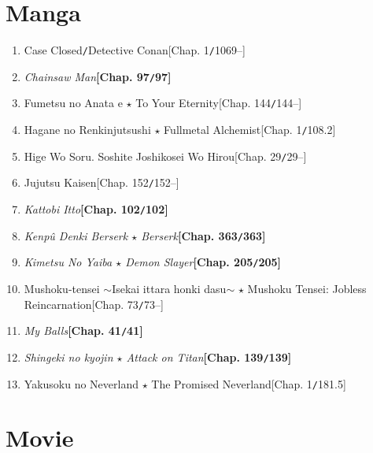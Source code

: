 \documentclass{article}
\numberwithin{equation}{section}
\begin{document}
\section{Manga}
\begin{enumerate}
    \item Case Closed\texttt{/}Detective Conan\hfill[Chap. 1\texttt{/}1069--]
    \item \textit{Chainsaw Man}\hfill\textbf{[Chap. 97\texttt{/}97]}
    \item Fumetsu no Anata e $\star$ To Your Eternity\hfill[Chap. 144\texttt{/}144--]
    \item Hagane no Renkinjutsushi $\star$ Fullmetal Alchemist\hfill[Chap. 1\texttt{/}108.2]
    \item Hige Wo Soru. Soshite Joshikosei Wo Hirou\hfill[Chap. 29\texttt{/}29--]
    \item Jujutsu Kaisen\hfill[Chap. 152\texttt{/}152--]
    \item \textit{Kattobi Itto}\hfill\textbf{[Chap. 102\texttt{/}102]}
    \item \textit{Kenp\^u Denki Berserk $\star$ Berserk}\hfill\textbf{[Chap. 363\texttt{/}363]}
    \item \textit{Kimetsu No Yaiba $\star$ Demon Slayer}\hfill\textbf{[Chap. 205\texttt{/}205]}
    \item Mushoku-tensei $\sim$Isekai ittara honki dasu$\sim$ $\star$ Mushoku Tensei: Jobless Reincarnation\hfill[Chap. 73\texttt{/}73--]
    \item \textit{My Balls}\hfill\textbf{[Chap. 41\texttt{/}41]}
    \item \textit{Shingeki no kyojin $\star$ Attack on Titan}\hfill\textbf{[Chap. 139\texttt{/}139]}
    \item Yakusoku no Neverland $\star$ The Promised Neverland\hfill[Chap. 1\texttt{/}181.5]
\end{enumerate}


\section{Movie}

\end{document}
